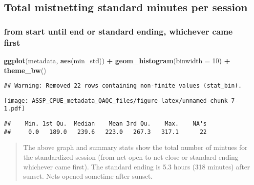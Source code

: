 \documentclass[
]{article}
\newenvironment{Shaded}{\begin{snugshade}}{\end{snugshade}}
\newcommand{\CommentTok}[1]{\textcolor[rgb]{0.56,0.35,0.01}{\textit{#1}}}
\newcommand{\DataTypeTok}[1]{\textcolor[rgb]{0.13,0.29,0.53}{#1}}
\newcommand{\DecValTok}[1]{\textcolor[rgb]{0.00,0.00,0.81}{#1}}
\newcommand{\KeywordTok}[1]{\textcolor[rgb]{0.13,0.29,0.53}{\textbf{#1}}}
\newcommand{\NormalTok}[1]{#1}
\newcommand{\OperatorTok}[1]{\textcolor[rgb]{0.81,0.36,0.00}{\textbf{#1}}}
\newcommand{\StringTok}[1]{\textcolor[rgb]{0.31,0.60,0.02}{#1}}
\begin{document}
\hypertarget{total-mistnetting-standard-minutes-per-session}{%
\subsection{Total mistnetting standard minutes per
session}\label{total-mistnetting-standard-minutes-per-session}}

\hypertarget{from-start-until-end-or-standard-ending-whichever-came-first}{%
\subsubsection{from start until end or standard ending, whichever came
first}\label{from-start-until-end-or-standard-ending-whichever-came-first}}

\begin{Shaded}
\begin{Highlighting}[]
\KeywordTok{ggplot}\NormalTok{(metadata, }\KeywordTok{aes}\NormalTok{(min_std)) }\OperatorTok{+}
\StringTok{  }\KeywordTok{geom_histogram}\NormalTok{(}\DataTypeTok{binwidth =} \DecValTok{10}\NormalTok{) }\OperatorTok{+}
\StringTok{  }\KeywordTok{theme_bw}\NormalTok{()}
\end{Highlighting}
\end{Shaded}

\begin{verbatim}
## Warning: Removed 22 rows containing non-finite values (stat_bin).
\end{verbatim}

\texttt{[image: ASSP\_CPUE\_metadata\_QAQC\_files/figure-latex/unnamed-chunk-7-1.pdf]}

\begin{Shaded}
\end{Shaded}

\begin{verbatim}
##    Min. 1st Qu.  Median    Mean 3rd Qu.    Max.    NA's 
##     0.0   189.0   239.6   223.0   267.3   317.1      22
\end{verbatim}

\begin{quote}
The above graph and summary stats show the total number of mintues for
the standardized session (from net open to net close or standard ending
whichever came first). The standard ending is 5.3 hours (318 minutes)
after sunset. Nets opened sometime after sunset.
\end{quote}
\end{document}
